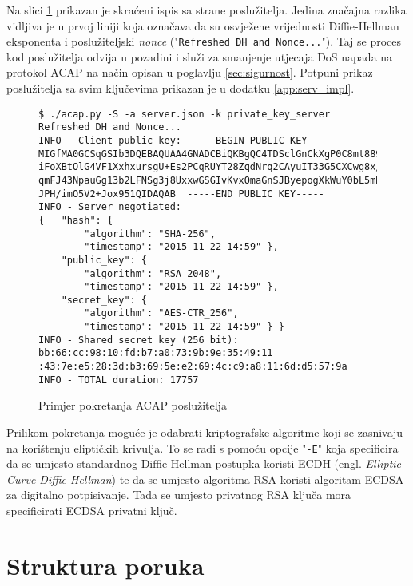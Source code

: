 Na slici \ref{fig:acap_server} prikazan je skraćeni ispis sa strane
poslužitelja.
Jedina značajna razlika vidljiva je u prvoj liniji koja označava da
su osvježene vrijednosti Diffie-Hellman eksponenta i poslužiteljski \emph{nonce}
("\texttt{Refreshed DH and Nonce...}"). Taj se proces kod poslužitelja odvija u
pozadini i služi za smanjenje utjecaja DoS napada na protokol ACAP na način
opisan u poglavlju \ref{sec:sigurnost}. Potpuni prikaz poslužitelja sa svim
ključevima prikazan je u dodatku \ref{app:serv_impl}.

\begin{figure}[htb]
\begin{footnotesize}
\begin{verbatim}
$ ./acap.py -S -a server.json -k private_key_server
Refreshed DH and Nonce...
INFO - Client public key: -----BEGIN PUBLIC KEY-----
MIGfMA0GCSqGSIb3DQEBAQUAA4GNADCBiQKBgQC4TDSclGnCkXgP0C8mt889rBRl
iFoXBtOlG4VF1XxhxursgU+Es2PCqRUYT28ZqdNrq2CAyuIT33G5CXCwg8x/CBh2
qmFJ43NpauGg13b2LFNSg3j8UxxwGSGIvKvxOmaGnSJByepogXkWuY0bL5mR0n0l
JPH/imO5V2+Jox951QIDAQAB  -----END PUBLIC KEY-----
INFO - Server negotiated: 
{   "hash": {
        "algorithm": "SHA-256",
        "timestamp": "2015-11-22 14:59" },
    "public_key": {
        "algorithm": "RSA_2048",
        "timestamp": "2015-11-22 14:59" },
    "secret_key": {
        "algorithm": "AES-CTR_256",
        "timestamp": "2015-11-22 14:59" } }
INFO - Shared secret key (256 bit): bb:66:cc:98:10:fd:b7:a0:73:9b:9e:35:49:11
:43:7e:e5:28:3d:b3:69:5e:e2:69:4c:c9:a8:11:6d:d5:57:9a
INFO - TOTAL duration: 17757
\end{verbatim}
\end{footnotesize}
\vspace{-15pt}
\caption{Primjer pokretanja ACAP poslužitelja}
\label{fig:acap_server}
\end{figure}

Prilikom pokretanja moguće je odabrati kriptografske algoritme koji se
zasnivaju na korištenju eliptičkih krivulja. To se radi s pomoću opcije
"\texttt{-E}" koja specificira da se umjesto standardnog Diffie-Hellman postupka
koristi ECDH (engl. \emph{Elliptic Curve Diffie-Hellman}) te da se umjesto
algoritma RSA koristi algoritam ECDSA za digitalno potpisivanje. Tada se
umjesto privatnog RSA ključa mora specificirati ECDSA privatni ključ.


\section{Struktura poruka}

